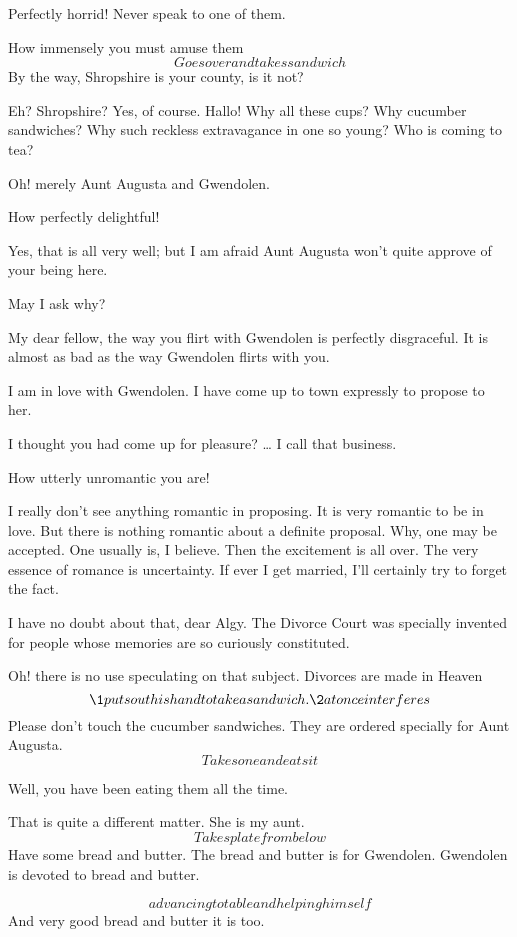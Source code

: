 \documentclass{book}
\begin{document}
\1  Perfectly horrid!  Never speak to one of them.

\2  How immensely you must amuse them  \[Goes over and takes
sandwich\]  By the way, Shropshire is your county, is it
not?

\1  Eh?  Shropshire?  Yes, of course.  Hallo!  Why all these
cups?  Why cucumber sandwiches?  Why such reckless extravagance in
one so young?  Who is coming to tea?

\2  Oh! merely Aunt Augusta and Gwendolen.

\1  How perfectly delightful!

\2  Yes, that is all very well; but I am afraid Aunt Augusta
won't quite approve of your being here.

\1  May I ask why?

\2  My dear fellow, the way you flirt with Gwendolen is
perfectly disgraceful.  It is almost as bad as the way Gwendolen
flirts with you.

\1  I am in love with Gwendolen.  I have come up to town
expressly to propose to her.

\2  I thought you had come up for pleasure? \ldots{} I call
that business.

\1  How utterly unromantic you are!

\2  I really don't see anything romantic in proposing.  It
is very romantic to be in love.  But there is nothing romantic
about a definite proposal.  Why, one may be accepted.  One usually
is, I believe.  Then the excitement is all over.  The very essence
of romance is uncertainty.  If ever I get married, I'll certainly
try to forget the fact.

\1  I have no doubt about that, dear Algy.  The Divorce Court
was specially invented for people whose memories are so curiously
constituted.

\2  Oh! there is no use speculating on that subject.
Divorces are made in Heaven \textendash\,\textendash  \[\1 puts out his hand to take a
sandwich.  \2 at once interferes\]  Please don't touch the
cucumber sandwiches.  They are ordered specially for Aunt Augusta.
\[Takes one and eats it\]

\1  Well, you have been eating them all the time.

\2  That is quite a different matter.  She is my aunt.
\[Takes plate from below\] Have some bread and butter.  The bread
and butter is for Gwendolen.  Gwendolen is devoted to bread and
butter.

\1  \[advancing to table and helping himself\]  And very good
bread and butter it is too.
\end{document}
